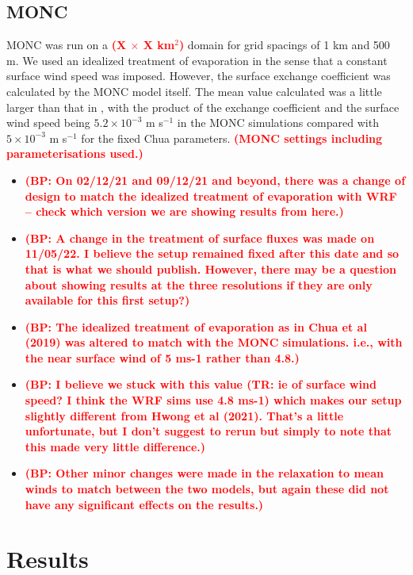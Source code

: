\documentclass[draft]{agujournal2019}
\newcommand{\todo}[1]{\textcolor{red}{\textbf{(#1)}}}
\begin{document}
\subsection{MONC}

MONC was run on a \todo{X $\times$ X km$^2$} domain for grid spacings of 1 km
and 500 m. We used an idealized treatment of evaporation in the sense that a
constant surface wind speed was imposed. However, the surface exchange
coefficient was calculated by the MONC model itself. The mean value calculated
was a little larger than that in , with the product of the
exchange coefficient and the surface wind speed being $5.2 \times 10^{-3}$ m
s$^{-1}$ in the MONC simulations compared with $5 \times 10^{-3}$ m s$^{-1}$ for
the fixed Chua parameters. \todo{MONC settings including parameterisations
used.}

\begin{itemize}
    \item \todo{BP: On 02/12/21 and 09/12/21 and beyond, there was a change of design to match
    the idealized treatment of evaporation with WRF -- check which version we are
    showing results from here.}    
    \item \todo{BP: A change in the treatment of surface fluxes was made on
    11/05/22. I believe the setup remained fixed after this date and so that is
    what we should publish. However, there may be a question about showing results
    at the three resolutions if they are only available for this first setup?}
    \item \todo{BP: The idealized treatment of evaporation as in Chua et al (2019) was
    altered to match with the MONC simulations. i.e., with the near surface wind of
    5 ms-1 rather than 4.8.}
    \item \todo{BP: I believe we stuck with this value (TR: ie of surface wind
    speed? I think the WRF sims use 4.8 ms-1) which makes our setup slightly
    different from Hwong et al (2021). That's a little unfortunate, but I don't
    suggest to rerun but simply to note that this made very little difference.}
    \item \todo{BP: Other minor changes were made in the relaxation to mean winds to
    match between the two models, but again these did not have any significant
    effects on the results.}
    \end{itemize}

\section{Results}
\label{sec:results}
\end{document}
